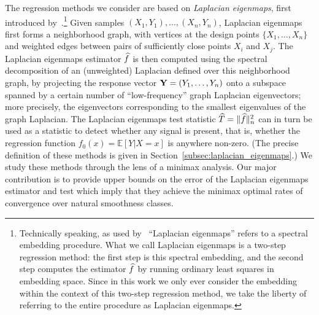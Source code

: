 The regression methods we consider are based on \emph{Laplacian eigenmaps}, first introduced by~\cite{belkin03a}.\footnote{Technically speaking, as used by~\cite{belkin03a} ``Laplacian eigenmaps'' refers to a spectral embedding procedure. What we call Laplacian eigenmaps is a two-step regression method: the first step is this spectral embedding, and the second step computes the estimator $\widehat{f}$ by running ordinary least squares in embedding space.  Since in this work we only ever consider the embedding within the context of this two-step regression method, we take the liberty of referring to the entire procedure as Laplacian eigenmaps.} Given samples $(X_1,Y_1),\ldots,(X_n,Y_n)$, Laplacian eigenmaps first forms a neighborhood graph, with vertices at the design points $\{X_1,\ldots,X_n\}$ and weighted edges between pairs of sufficiently close points $X_i$ and $X_j$. The Laplacian eigenmaps estimator $\widehat{f}$ is then computed using the spectral decomposition of an (unweighted) Laplacian defined over this neighborhood graph, by projecting the response vector ${\bf Y} = (Y_1,\ldots,Y_n)$ onto a subspace spanned by a certain number of ``low-frequency'' graph Laplacian eigenvectors; more precisely, the eigenvectors corresponding to the smallest eigenvalues of the graph Laplacian. The Laplacian eigenmaps test statistic $\widehat{T} = \|\widehat{f}\|_n^2$ can in turn be used as a statistic to detect whether any signal is present, that is, whether the regression function $f_0(x) = \mathbb{E}[Y|X = x]$ is anywhere non-zero. (The precise definition of these methods is given in Section~\ref{subsec:laplacian_eigenmaps}.) We study these methods through the lens of a minimax analysis. Our major contribution is to provide upper bounds on the error of the Laplacian eigenmaps estimator and test which imply that they achieve the minimax optimal rates of convergence over natural smoothness classes.

